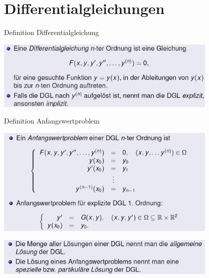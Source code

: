 \section{Differentialgleichungen}
\begin{definition}{Definition Differentialgleichung}
  \begin{center}
  \includegraphics[width=0.8\textwidth]{images/2024-06-02-22-02-44.png}
  \end{center}
\end{definition}
\begin{definition}{Definition Anfangswertproblem}
  \begin{center}
  \includegraphics[width=0.8\textwidth]{images/2024-06-02-22-03-51.png}
  \end{center}
  \begin{center}
  \includegraphics[width=0.8\textwidth]{images/2024-06-02-22-04-20.png}
  \end{center}
\end{definition}
